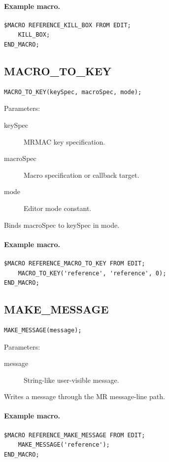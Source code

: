 \documentclass[a4paper,10pt,twoside,openany]{book}
\newenvironment{mrmacextension}{\begin{changebar}}{\end{changebar}}
\begin{document}
\paragraph{Example macro.}
\begin{verbatim}
$MACRO REFERENCE_KILL_BOX FROM EDIT;
    KILL_BOX;
END_MACRO;
\end{verbatim}

\label{prim:procedure-macro-to-key}
\subsection*{MACRO\_TO\_KEY}
\begin{verbatim}
MACRO_TO_KEY(keySpec, macroSpec, mode);
\end{verbatim}
Parameters:
\begin{description}
\item[keySpec] MRMAC key specification.
\item[macroSpec] Macro specification or callback target.
\item[mode] Editor mode constant.
\end{description}

Binds macroSpec to keySpec in mode.

\paragraph{Example macro.}
\begin{verbatim}
$MACRO REFERENCE_MACRO_TO_KEY FROM EDIT;
    MACRO_TO_KEY('reference', 'reference', 0);
END_MACRO;
\end{verbatim}

\begin{mrmacextension}
\label{prim:procedure-make-message}
\subsection*{MAKE\_MESSAGE}
\begin{verbatim}
MAKE_MESSAGE(message);
\end{verbatim}
Parameters:
\begin{description}
\item[message] String-like user-visible message.
\end{description}

Writes a message through the MR message-line path.

\paragraph{Example macro.}
\begin{verbatim}
$MACRO REFERENCE_MAKE_MESSAGE FROM EDIT;
    MAKE_MESSAGE('reference');
END_MACRO;
\end{verbatim}
\end{mrmacextension}
\end{document}
